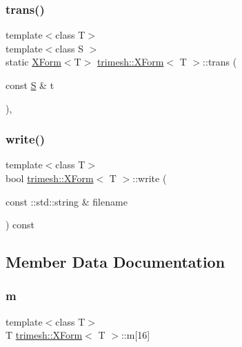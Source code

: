 \subsubsection{\texorpdfstring{trans()}{trans()}\hspace{0.1cm}{\footnotesize\ttfamily [2/2]}}
{\footnotesize\ttfamily template$<$class T$>$ \\
template$<$class S $>$ \\
static \hyperlink{classtrimesh_1_1XForm}{X\+Form}$<$T$>$ \hyperlink{classtrimesh_1_1XForm}{trimesh\+::\+X\+Form}$<$ T $>$\+::trans (\begin{DoxyParamCaption}\item[{const \hyperlink{ego_8cc_abde73cd36321648268fb4543509b996a}{S} \&}]{t }\end{DoxyParamCaption})\hspace{0.3cm}{\ttfamily [inline]}, {\ttfamily [static]}}

\mbox{\label{classtrimesh_1_1XForm_af25e9dfee117f59d100cc72957b71305}} 
\subsubsection{\texorpdfstring{write()}{write()}}
{\footnotesize\ttfamily template$<$class T$>$ \\
bool \hyperlink{classtrimesh_1_1XForm}{trimesh\+::\+X\+Form}$<$ T $>$\+::write (\begin{DoxyParamCaption}\item[{const \+::std\+::string \&}]{filename }\end{DoxyParamCaption}) const\hspace{0.3cm}{\ttfamily [inline]}}



\subsection{Member Data Documentation}
\mbox{\label{classtrimesh_1_1XForm_ab481d3d615eba7c43c417bc0706c5701}} 
\subsubsection{\texorpdfstring{m}{m}}
{\footnotesize\ttfamily template$<$class T$>$ \\
T \hyperlink{classtrimesh_1_1XForm}{trimesh\+::\+X\+Form}$<$ T $>$\+::m\mbox{[}16\mbox{]}\hspace{0.3cm}{\ttfamily [protected]}}



